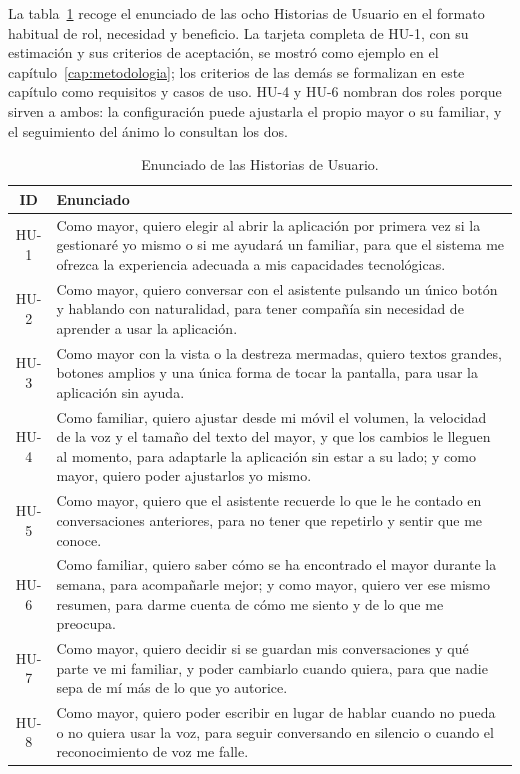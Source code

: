 La tabla~\ref{tab:enunciado-hu} recoge el enunciado de las ocho Historias de Usuario en el formato habitual
de rol, necesidad y beneficio. La tarjeta completa de HU-1, con su estimación y sus criterios de aceptación,
se mostró como ejemplo en el capítulo~\ref{cap:metodologia}; los criterios de las demás se formalizan en este
capítulo como requisitos y casos de uso. HU-4 y HU-6 nombran dos roles porque sirven a ambos: la
configuración puede ajustarla el propio mayor o su familiar, y el seguimiento del ánimo lo consultan los dos.

\begin{table}[htbp]
    \centering
    \small
    \begin{tabularx}{\textwidth}{@{}c >{\RaggedRight\arraybackslash}X@{}}
        \toprule
        \textbf{ID} & \textbf{Enunciado} \\
        \midrule
        HU-1 & Como mayor, quiero elegir al abrir la aplicación por primera vez si la gestionaré yo mismo o si
        me ayudará un familiar, para que el sistema me ofrezca la experiencia adecuada a mis capacidades
        tecnológicas. \\
        \addlinespace
        HU-2 & Como mayor, quiero conversar con el asistente pulsando un único botón y hablando con
        naturalidad, para tener compañía sin necesidad de aprender a usar la aplicación. \\
        \addlinespace
        HU-3 & Como mayor con la vista o la destreza mermadas, quiero textos grandes, botones amplios y una
        única forma de tocar la pantalla, para usar la aplicación sin ayuda. \\
        \addlinespace
        HU-4 & Como familiar, quiero ajustar desde mi móvil el volumen, la velocidad de la voz y el tamaño del
        texto del mayor, y que los cambios le lleguen al momento, para adaptarle la aplicación sin estar a su
        lado; y como mayor, quiero poder ajustarlos yo mismo. \\
        \addlinespace
        HU-5 & Como mayor, quiero que el asistente recuerde lo que le he contado en conversaciones
        anteriores, para no tener que repetirlo y sentir que me conoce. \\
        \addlinespace
        HU-6 & Como familiar, quiero saber cómo se ha encontrado el mayor durante la semana, para acompañarle
        mejor; y como mayor, quiero ver ese mismo resumen, para darme cuenta de cómo me siento y de lo que me
        preocupa. \\
        \addlinespace
        HU-7 & Como mayor, quiero decidir si se guardan mis conversaciones y qué parte ve mi familiar, y
        poder cambiarlo cuando quiera, para que nadie sepa de mí más de lo que yo autorice. \\
        \addlinespace
        HU-8 & Como mayor, quiero poder escribir en lugar de hablar cuando no pueda o no quiera usar la voz,
        para seguir conversando en silencio o cuando el reconocimiento de voz me falle. \\
        \bottomrule
    \end{tabularx}
    \caption{Enunciado de las Historias de Usuario.}
    \label{tab:enunciado-hu}
\end{table}

